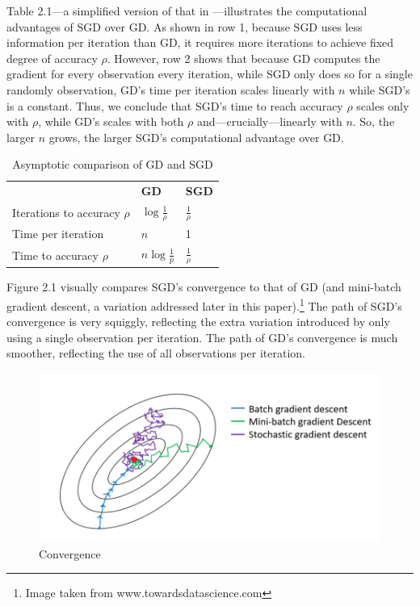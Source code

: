 \documentclass{report}
\begin{document}
Table 2.1---a simplified version of that in \cite{bottou2010large}---illustrates
the computational advantages of SGD over GD. As shown in row 1, because SGD uses
less information per iteration than GD, it requires more iterations to achieve
fixed degree of accuracy $\rho$.
However, row 2 shows that because GD computes the gradient for every observation every iteration,
while SGD only does so for a single randomly observation, GD's time per
iteration scales linearly with $n$ while SGD's is a constant. Thus, we conclude
that SGD's time to
reach accuracy $\rho$ scales only with $\rho$, while GD's scales with both
$\rho$ and---crucially---linearly with $n$. So, the larger $n$ grows, the larger
SGD's computational advantage over GD.

\begin{table}[h]
	\centering
	\caption{Asymptotic comparison of GD and SGD}
	\begin{tabular}{|l l l|}
		\hline
		& \textbf{GD} & \textbf{SGD} \\
		Iterations to accuracy $\rho$ & $\log \frac{1}{\rho}$ & $\frac{1}{\rho}$ \\
		Time per iteration & $n$ & 1 \\
		Time to accuracy $\rho$ & $n \log \frac{1}{p}$ & $\frac{1}{\rho}$ \\
		\hline
	\end{tabular}
\end{table}

Figure 2.1 visually compares SGD's convergence to that of GD (and
mini-batch gradient descent, a variation addressed later in this
paper).\footnote{Image taken from www.towardsdatascience.com} The
path of SGD's convergence is very squiggly, reflecting the extra variation
introduced by only using a single observation per iteration. The path of GD's
convergence is much smoother, reflecting the use of all observations per
iteration.

\begin{figure}[t]
	\centering
	\caption{Convergence}
\includegraphics[scale=0.3]{img}
\end{figure}
\end{document}
